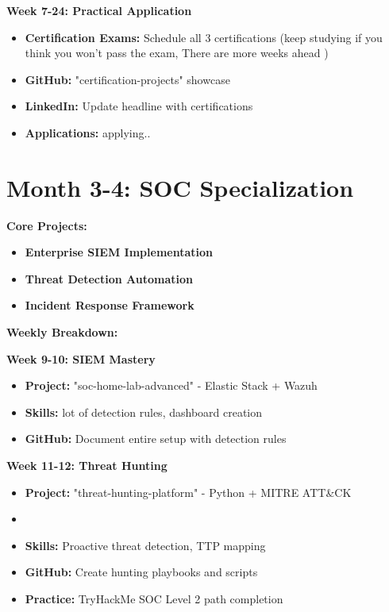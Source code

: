 \documentclass[11pt,a4paper]{article}
\begin{document}
\textbf{Week 7-24: Practical Application}
\begin{itemize}
    \item \textbf{Certification Exams:} Schedule all 3 certifications (keep studying if you think you won't pass the exam, There are more weeks ahead )
    \item \textbf{GitHub:} "certification-projects" showcase
    \item \textbf{LinkedIn:} Update headline with certifications
    \item \textbf{Applications:} applying..
\end{itemize}

\section*{Month 3-4: SOC Specialization}

\textbf{\color{cyberblue} Core Projects:}
\begin{itemize}
    \item \textbf{Enterprise SIEM Implementation}
    \item \textbf{Threat Detection Automation}
    \item \textbf{Incident Response Framework}
\end{itemize}

\textbf{\color{cybergreen} Weekly Breakdown:}

\textbf{Week 9-10: SIEM Mastery}
\begin{itemize}
    \item \textbf{Project:} "soc-home-lab-advanced" - Elastic Stack + Wazuh
    \item \textbf{Skills:} lot of detection rules, dashboard creation
    \item \textbf{GitHub:} Document entire setup with detection rules
\end{itemize}

\textbf{Week 11-12: Threat Hunting}
\begin{itemize}
    \item \textbf{Project:} "threat-hunting-platform" - Python + MITRE ATT\&CK
    \item \item \textbf{Skills:} Proactive threat detection, TTP mapping
    \item \textbf{GitHub:} Create hunting playbooks and scripts
    \item \textbf{Practice:} TryHackMe SOC Level 2 path completion
\end{itemize}
\end{document}
